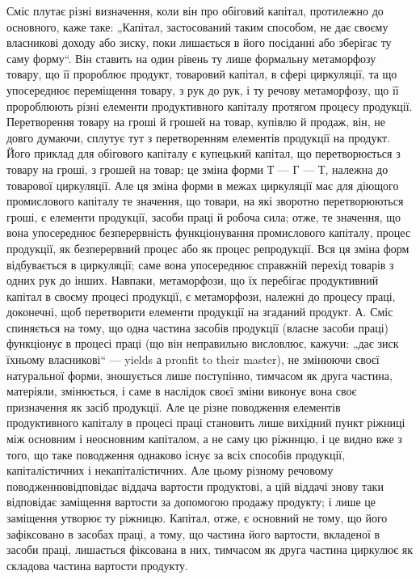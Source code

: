 Сміс плутає різні визначення, коли він про обіговий капітал, протилежно
до основного, каже таке: „Капітал, застосований таким способом,
не дає своєму власникові доходу або зиску, поки лишається в його посіданні
або зберігає ту саму форму“. Він ставить на один рівень ту лише
формальну метаморфозу товару, що її пророблює продукт, товаровий
капітал, в сфері циркуляції, та що упосереднює переміщення товару,
з рук до рук, і ту речову метаморфозу, що її пророблюють різні елементи
продуктивного капіталу протягом процесу продукції. Перетворення
товару на гроші й грошей на товар, купівлю й продаж, він, не довго
думаючи, сплутує тут з перетворенням елементів продукції на продукт.
Його приклад для обігового капіталу є купецький капітал, що перетворюється
з товару на гроші, з грошей на товар; це зміна форми Т — Г — Т,
належна до товарової циркуляції. Але ця зміна форми в межах циркуляції
має для діющого промислового капіталу те значення, що товари, на
які зворотно перетворюються гроші, є елементи продукції, засоби праці
й робоча сила; отже, те значення, що вона упосереднює безперервність
функціонування промислового капіталу, процес продукції, як безперервний
процес або як процес репродукції. Вся ця зміна форм відбувається
в циркуляції; саме вона упосереднює справжній перехід товарів з
одних рук до інших. Навпаки, метаморфози, що їх перебігає продуктивний
капітал в своєму процесі продукції, є метаморфози, належні до
процесу праці, доконечні, щоб перетворити елементи продукції на
згаданий продукт. А. Сміс спиняється на тому, що одна частина засобів
продукції (власне засоби праці) функціонує в процесі праці (що він
неправильно висловлює, кажучи: „дає зиск їхньому власникові“ — yields а
pronfit to their master), не змінюючи своєї натуральної форми, зношується
лише поступінно, тимчасом як друга частина, матеріяли, змінюється, і
саме в наслідок своєї зміни виконує вона своє призначення як засіб продукції.
Але це різне поводження елементів продуктивного капіталу в
процесі праці становить лише вихідний пункт ріжниці між основним і неосновним
капіталом, а не саму цю ріжннцю, і це видно вже з того, що
таке поводження однаково існує за всіх способів продукції, капіталістичних
і некапіталістичних. Але цьому різному речовому поводженнювідповідає
віддача вартости продуктові, а цій віддачі знову таки відповідає
заміщення вартости за допомогою продажу продукту; і лише це
заміщення утворює ту ріжницю. Капітал, отже, є основний не тому, що
його зафіксовано в засобах праці, а тому, що частина його вартости,
вкладеної в засоби праці, лишається фіксована в них, тимчасом як друга
частина циркулює як складова частина вартости продукту.

